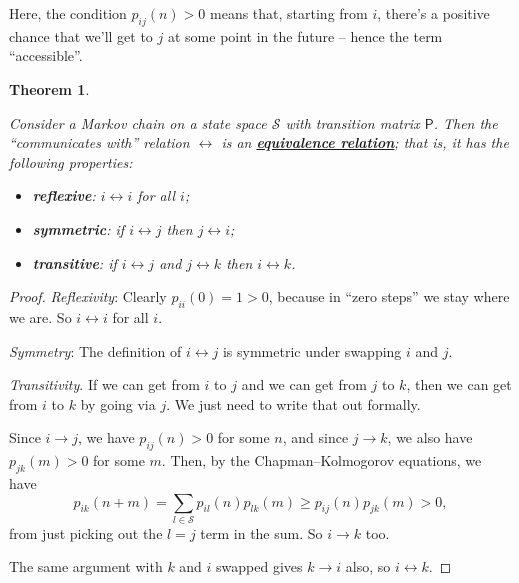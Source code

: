 \documentclass[
  a4paper,
]{article}
\providecommand{\tightlist}{%
  \setlength{\itemsep}{0pt}\setlength{\parskip}{0pt}}
\newtheorem{theorem}{Theorem}[section]
\theoremstyle{definition}
\theoremstyle{definition}
\theoremstyle{definition}
\theoremstyle{remark}
\begin{document}
Here, the condition \(p_{ij}(n)>0\) means that, starting from \(i\), there's a positive chance that we'll get to \(j\) at some point in the future -- hence the term ``accessible''.

\begin{theorem}
\protect\hypertarget{thm:equiv-rel}{}\label{thm:equiv-rel}

Consider a Markov chain on a state space \(\mathcal S\) with transition matrix \(\mathsf P\). Then the ``communicates with'' relation \(\leftrightarrow\) is an \href{https://en.wikipedia.org/wiki/Equivalence_relation}{\textbf{equivalence relation}}; that is, it has the following properties:

\begin{itemize}
\tightlist
\item
  \textbf{reflexive}: \(i \leftrightarrow i\) for all \(i\);
\item
  \textbf{symmetric}: if \(i \leftrightarrow j\) then \(j \leftrightarrow i\);
\item
  \textbf{transitive}: if \(i \leftrightarrow j\) and \(j \leftrightarrow k\) then \(i \leftrightarrow k\).
\end{itemize}

\end{theorem}

\begin{proof}

\emph{Reflexivity}: Clearly \(p_{ii}(0) = 1 > 0\), because in ``zero steps'' we stay where we are. So \(i \leftrightarrow i\) for all \(i\).

\emph{Symmetry}: The definition of \(i \leftrightarrow j\) is symmetric under swapping \(i\) and \(j\).

\emph{Transitivity}. If we can get from \(i\) to \(j\) and we can get from \(j\) to \(k\), then we can get from \(i\) to \(k\) by going via \(j\). We just need to write that out formally.

Since \(i \to j\), we have \(p_{ij}(n) > 0\) for some \(n\), and since \(j \to k\), we also have \(p_{jk}(m) > 0\) for some \(m\). Then, by the Chapman--Kolmogorov equations, we have
\[ p_{ik}(n+m) = \sum_{l \in \mathcal S} p_{il}(n) p_{lk}(m) \geq p_{ij}(n) p_{jk}(m) > 0 , \]
from just picking out the \(l=j\) term in the sum. So \(i \to k\) too.

The same argument with \(k\) and \(i\) swapped gives \(k \to i\) also, so \(i \leftrightarrow k\).

\end{proof}
\end{document}
